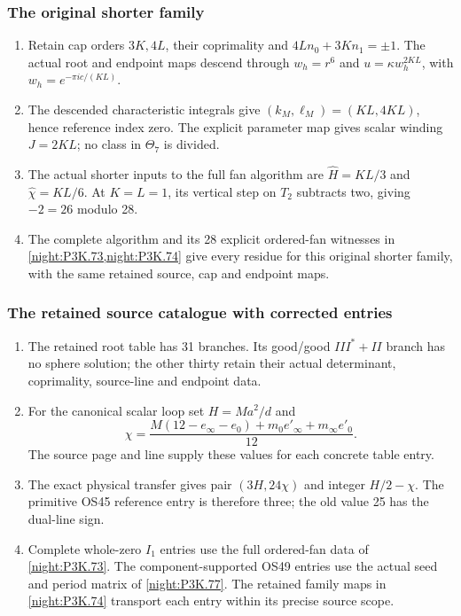 \subsubsection{The original shorter family}
\RungOne
\begin{enumerate}[label=\arabic*.]
\item Retain cap orders $3K,4L$, their coprimality and
  $4Ln_0+3Kn_1=\pm1$. The actual root and endpoint maps
  descend through $w_h=r^6$ and
  $u=\kappa w_h^{2KL}$, with
  $w_h=e^{-\pi i c/(KL)}$.
\item The descended characteristic integrals give
  $(k_M,\ell_M)=(KL,4KL)$, hence reference index zero.
  The explicit parameter map gives scalar winding $J=2KL$;
  no class in $\Theta_7$ is divided.
\item The actual shorter inputs to the full fan algorithm
  are $\widehat H=KL/3$ and $\widehat\chi=KL/6$.
  At $K=L=1$, its vertical step on $T_2$ subtracts two,
  giving $-2=26$ modulo 28.
\item The complete algorithm and its 28 explicit ordered-fan
  witnesses in \cref{night:P3K.73,night:P3K.74} give every
  residue for this original shorter family, with the same
  retained source, cap and endpoint maps.
\end{enumerate}

\subsubsection{The retained source catalogue with corrected entries}
\RungOne
\begin{enumerate}[label=\arabic*.]
\item The retained root table has 31 branches. Its
  good/good $III^*+II$ branch has no sphere solution;
  the other thirty retain their actual determinant,
  coprimality, source-line and endpoint data.
\item For the canonical scalar loop set $H=Ma^2/d$ and
  \[
  \chi=\frac{M(12-e_\infty-e_0)+m_0e'_\infty+m_\infty e'_0}{12}.
  \]
  The source page and line supply these values for each
  concrete table entry.
\item The exact physical transfer gives pair $(3H,24\chi)$
  and integer $H/2-\chi$. The primitive OS45 reference
  entry is therefore three; the old value 25 has the
  dual-line sign.
\item Complete whole-zero $I_1$ entries use the full
  ordered-fan data of \cref{night:P3K.73}. The
  component-supported OS49 entries use the actual seed
  and period matrix of \cref{night:P3K.77}.
  The retained family maps in \cref{night:P3K.74}
  transport each entry within its precise source scope.
\end{enumerate}

